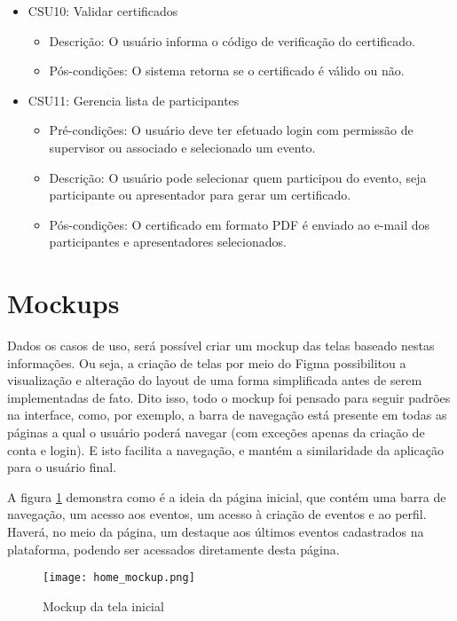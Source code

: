 \begin{itemize}
\begin{itemize}
        \end{itemize}
    \item CSU10: Validar certificados
        \begin{itemize}
            \item Descrição: O usuário informa o código de verificação do certificado.
            \item Pós-condições: O sistema retorna se o certificado é válido ou não.
        \end{itemize}
    \item CSU11: Gerencia lista de participantes
        \begin{itemize}
            \item Pré-condições: O usuário deve ter efetuado login com permissão de supervisor ou associado e selecionado um evento.
            \item Descrição: O usuário pode selecionar quem participou do evento, seja participante ou apresentador para gerar um certificado.
            \item Pós-condições: O certificado em formato PDF é enviado ao e-mail dos participantes e apresentadores selecionados.
        \end{itemize}
        
\end{itemize}

\section{Mockups}
Dados os casos de uso, será possível criar um mockup das telas baseado nestas informações. Ou seja, a criação de telas por meio do Figma possibilitou a visualização e alteração do layout de uma forma simplificada antes de serem implementadas de fato. Dito isso, todo o mockup foi pensado para seguir padrões na interface, como, por exemplo, a barra de navegação está presente em todas as páginas a qual o usuário poderá navegar (com exceções apenas da criação de conta e login). E isto facilita a navegação, e mantém a similaridade da aplicação para o usuário final.  

A figura \ref{home_mockup} demonstra como é a ideia da página inicial, que contém uma barra de navegação, um acesso aos eventos, um acesso à criação de eventos e ao perfil. Haverá, no meio da página, um destaque aos últimos eventos cadastrados na plataforma, podendo ser acessados diretamente desta página.
\begin{figure}[H]
    \caption{\label{home_mockup}Mockup da tela inicial}
    \vspace{5pt}
    \centering
    \texttt{[image: home\_mockup.png]}
    \vspace{5pt}
\end{figure}

